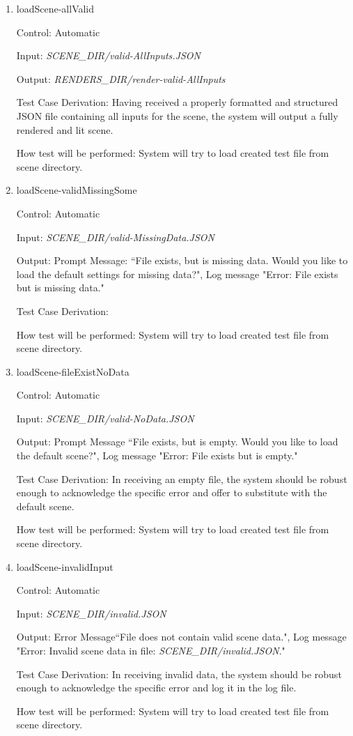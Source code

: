 \documentclass[12pt, titlepage]{article}
\begin{document}
\begin{enumerate}

\item{loadScene-allValid\\}

Control: Automatic
								
Input: \textit{SCENE\_DIR/valid-AllInputs.JSON}
					
Output: \textit{RENDERS\_DIR/render-valid-AllInputs}

Test Case Derivation: Having received a properly formatted and structured JSON 
file containing all inputs for the scene, the system will output a fully 
rendered and lit scene.
					
How test will be performed: System will try to load created test file from 
scene directory.
					
\item{loadScene-validMissingSome\\}

Control: Automatic

Input: \textit{SCENE\_DIR/valid-MissingData.JSON}

Output: Prompt Message: ``File exists, but is missing data. Would you like to 
load the default settings for missing data?", Log message "Error: File exists 
but is missing data."

Test Case Derivation: 

How test will be performed: System will try to load created test file from 
scene directory.

\item{loadScene-fileExistNoData\\}

Control: Automatic
									
Input: \textit{SCENE\_DIR/valid-NoData.JSON}

Output: Prompt Message ``File exists, but is empty. Would you like to load the 
default scene?", Log message "Error: File exists but is empty."

Test Case Derivation: In receiving an empty file, the system should be robust 
enough to acknowledge the specific error and offer to substitute with the 
default scene.

How test will be performed: System will try to load created test file from 
scene directory.

\item{loadScene-invalidInput\\}

Control: Automatic

Input: \textit{SCENE\_DIR/invalid.JSON}

Output: Error Message``File does not contain valid scene data.", Log message 
"Error: Invalid scene data in file: \textit{SCENE\_DIR/invalid.JSON}."

Test Case Derivation: In receiving invalid data, the system should be robust 
enough to acknowledge the specific error and log it in the log file.

How test will be performed: System will try to load created test file from 
scene directory.

\end{enumerate}
\end{document}
